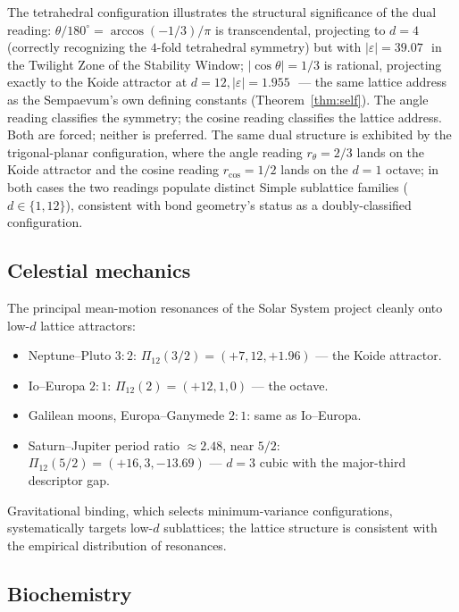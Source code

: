 \documentclass[11pt,a4paper]{article}
\theoremstyle{definition}
\theoremstyle{remark}
\newcommand{\eps}{\varepsilon}
\begin{document}
\noindent The tetrahedral configuration illustrates the structural significance of the dual reading: $\theta/180^{\circ} = \arccos(-1/3)/\pi$ is transcendental, projecting to $d=4$ (correctly recognizing the $4$-fold tetrahedral symmetry) but with $|\eps|=39.07$\,\textcent\ in the Twilight Zone of the Stability Window; $|\cos\theta|=1/3$ is rational, projecting exactly to the Koide attractor at $d=12, |\eps|=1.955$\,\textcent\ --- the same lattice address as the Sempaevum's own defining constants (Theorem~\ref{thm:self}). The angle reading classifies the symmetry; the cosine reading classifies the lattice address. Both are forced; neither is preferred. The same dual structure is exhibited by the trigonal-planar configuration, where the angle reading $r_{\theta}=2/3$ lands on the Koide attractor and the cosine reading $r_{\cos}=1/2$ lands on the $d=1$ octave; in both cases the two readings populate distinct Simple sublattice families ($d \in \{1,12\}$), consistent with bond geometry's status as a doubly-classified configuration.

\subsection{Celestial mechanics}\label{subsec:celestial}

The principal mean-motion resonances of the Solar System project cleanly onto low-$d$ lattice attractors:
\begin{itemize}[leftmargin=*]
\item Neptune--Pluto $3{:}2$: $\Pi_{12}(3/2) = (+7, 12, +1.96)$ --- the Koide attractor.
\item Io--Europa $2{:}1$: $\Pi_{12}(2) = (+12, 1, 0)$ --- the octave.
\item Galilean moons, Europa--Ganymede $2{:}1$: same as Io--Europa.
\item Saturn--Jupiter period ratio $\approx 2.48$, near $5/2$: $\Pi_{12}(5/2) = (+16, 3, -13.69)$ --- $d=3$ cubic with the major-third descriptor gap.
\end{itemize}

Gravitational binding, which selects minimum-variance configurations, systematically targets low-$d$ sublattices; the lattice structure is consistent with the empirical distribution of resonances.

\subsection{Biochemistry}\label{subsec:biology}
\end{document}
